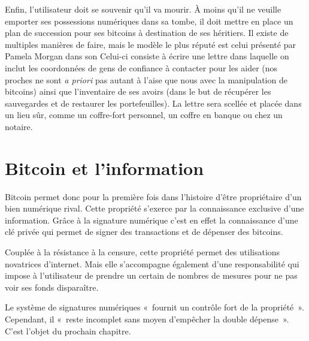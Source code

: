 Enfin, l'utilisateur doit se souvenir qu'il va mourir. À moins qu'il ne veuille emporter ses possessions numériques dans sa tombe, il doit mettre en place un plan de succession pour ses bitcoins à destination de ses héritiers. Il existe de multiples manières de faire, mais le modèle le plus réputé est celui présenté par Pamela Morgan dans son  Celui-ci consiste à écrire une lettre dans laquelle on inclut les coordonnées de gens de confiance à contacter pour les aider (nos proches ne sont \emph{a priori} pas autant à l'aise que nous avec la manipulation de bitcoins) ainsi que l'inventaire de ses avoirs (dans le but de récupérer les sauvegardes et de restaurer les portefeuilles). La lettre sera scellée et placée dans un lieu sûr, comme un coffre-fort personnel, un coffre en banque ou chez un notaire.

\section*{Bitcoin et l'information}

Bitcoin permet donc pour la première fois dans l'histoire d'être propriétaire d'un bien numérique rival. Cette propriété s'exerce par la connaissance exclusive d'une information. Grâce à la signature numérique c'est en effet la connaissance d'une clé privée qui permet de signer des transactions et de dépenser des bitcoins.

Couplée à la résistance à la censure, cette propriété permet des utilisations novatrices d'internet. Mais elle s'accompagne également d'une responsabilité qui impose à l'utilisateur de prendre un certain de nombres de mesures pour ne pas voir ses fonds disparaître.

Le système de signatures numériques «~fournit un contrôle fort de la propriété~». Cependant, il «~reste incomplet sans moyen d'empêcher la double dépense~». C'est l'objet du prochain chapitre.

\printendnotes